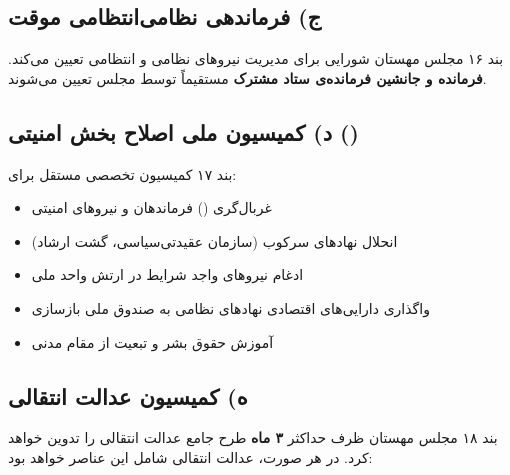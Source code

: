 \documentclass[12pt,a4paper,twoside,openany]{book}
\begin{document}
	\subsection{ج) فرماندهی نظامی‌انتظامی موقت}
	
	\begin{bandbox}{بند ۱۶}
		مجلس مهستان شورایی برای مدیریت نیروهای نظامی و انتظامی تعیین می‌کند.
		\textbf{فرمانده و جانشین فرمانده‌ی ستاد مشترک} مستقیماً توسط مجلس تعیین می‌شوند.
	\end{bandbox}
	
	\subsection{د) کمیسیون ملی اصلاح بخش امنیتی ()}
	
	\begin{bandbox}{بند ۱۷}
		کمیسیون تخصصی مستقل برای:
		\begin{itemize}
			\item غربال‌گری () فرماندهان و نیروهای امنیتی
			\item انحلال نهادهای سرکوب (سازمان عقیدتی‌سیاسی، گشت ارشاد)
			\item ادغام نیروهای واجد شرایط در ارتش واحد ملی
			\item واگذاری دارایی‌های اقتصادی نهادهای نظامی به صندوق ملی بازسازی
			\item آموزش حقوق بشر و تبعیت از مقام مدنی
		\end{itemize}
	\end{bandbox}
	
	\subsection{ه) کمیسیون عدالت انتقالی}
	
	\begin{bandbox}{بند ۱۸}
		مجلس مهستان ظرف حداکثر \textbf{۳ ماه} طرح جامع عدالت انتقالی را تدوین خواهد کرد.
		در هر صورت، عدالت انتقالی شامل این عناصر خواهد بود:
	\end{bandbox}
	
\end{document}

